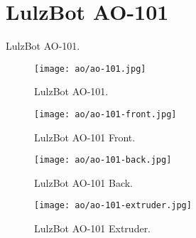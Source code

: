 %
%
%
%
%

\section{LulzBot AO-101}
LulzBot AO-101.

\begin{figure}[h!]
\texttt{[image: ao/ao-101.jpg]}
 \caption{LulzBot AO-101.}
 \label{fig:ao-101}
\end{figure}

\begin{figure}[h!]
\texttt{[image: ao/ao-101-front.jpg]}
 \caption{LulzBot AO-101 Front.}
 \label{fig:ao-101-front}
\end{figure}

\begin{figure}[h!]
\texttt{[image: ao/ao-101-back.jpg]}
 \caption{LulzBot AO-101 Back.}
 \label{fig:ao-101-back}
\end{figure}




\begin{figure}[h!]
\texttt{[image: ao/ao-101-extruder.jpg]}
 \caption{LulzBot AO-101 Extruder.}
 \label{fig:ao-101-extruder}
\end{figure}

